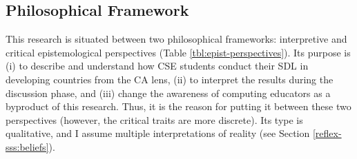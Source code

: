                 

        

        

\subsection{Philosophical Framework}
\label{res-met-ss:phil-framework}

This research is situated between two philosophical frameworks: interpretive and critical epistemological perspectives (Table \ref{tbl:epist-perspectives}). Its purpose is (i) to describe and understand how \gls{CSE} students conduct their \gls{SDL} in developing countries from the \gls{CA} lens, (ii) to interpret the results during the discussion phase, and (iii) change the awareness of computing educators as a byproduct of this research. Thus, it is the reason for putting it between these two perspectives (however, the critical traits are more discrete). Its type is qualitative, and I assume multiple interpretations of reality (see Section \ref{reflex-sss:beliefs}).



